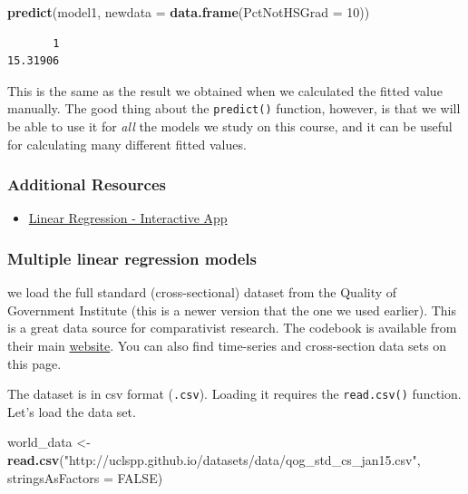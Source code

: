 \documentclass[]{article}
\newenvironment{Shaded}{\begin{snugshade}}{\end{snugshade}}
\newcommand{\DataTypeTok}[1]{\textcolor[rgb]{0.13,0.29,0.53}{#1}}
\newcommand{\DecValTok}[1]{\textcolor[rgb]{0.00,0.00,0.81}{#1}}
\newcommand{\KeywordTok}[1]{\textcolor[rgb]{0.13,0.29,0.53}{\textbf{#1}}}
\newcommand{\NormalTok}[1]{#1}
\newcommand{\OtherTok}[1]{\textcolor[rgb]{0.56,0.35,0.01}{#1}}
\newcommand{\StringTok}[1]{\textcolor[rgb]{0.31,0.60,0.02}{#1}}
\providecommand{\tightlist}{%
  \setlength{\itemsep}{0pt}\setlength{\parskip}{0pt}}
\begin{document}
\begin{Shaded}
\begin{Highlighting}[]
\KeywordTok{predict}\NormalTok{(model1, }\DataTypeTok{newdata =} \KeywordTok{data.frame}\NormalTok{(}\DataTypeTok{PctNotHSGrad =} \DecValTok{10}\NormalTok{))}
\end{Highlighting}
\end{Shaded}

\begin{verbatim}
       1 
15.31906 
\end{verbatim}

This is the same as the result we obtained when we calculated the fitted value manually. The good thing about the \texttt{predict()} function, however, is that we will be able to use it for \emph{all} the models we study on this course, and it can be useful for calculating many different fitted values.

\hypertarget{additional-resources}{%
\subsubsection{Additional Resources}\label{additional-resources}}

\begin{itemize}
\tightlist
\item
  \href{http://altaf.shinyapps.io/linear-regression}{Linear Regression - Interactive App}
\end{itemize}

\hypertarget{multiple-linear-regression-models}{%
\subsubsection{Multiple linear regression models}\label{multiple-linear-regression-models}}

we load the full standard (cross-sectional) dataset from the Quality of Government Institute (this is a newer version that the one we used earlier). This is a great data source for comparativist research. The codebook is available from their main \href{http://qog.pol.gu.se/data/datadownloads/qogstandarddata}{website}. You can also find time-series and cross-section data sets on this page.

The dataset is in csv format (\texttt{.csv}). Loading it requires the \texttt{read.csv()} function. Let's load the data set.

\begin{Shaded}
\begin{Highlighting}[]
\NormalTok{world_data <-}\StringTok{ }\KeywordTok{read.csv}\NormalTok{(}\StringTok{"http://uclspp.github.io/datasets/data/qog_std_cs_jan15.csv"}\NormalTok{, }\DataTypeTok{stringsAsFactors =} \OtherTok{FALSE}\NormalTok{)}
\end{Highlighting}
\end{Shaded}
\end{document}
